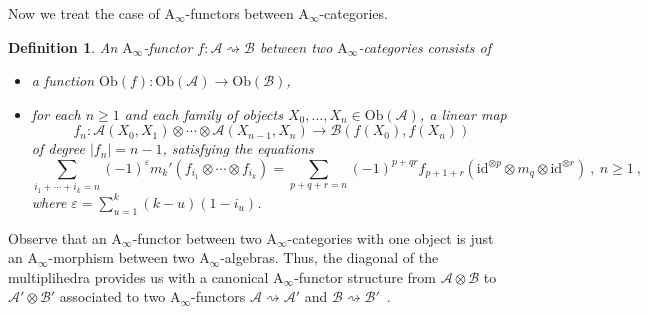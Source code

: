 \documentclass[twoside, 12pt]{amsart}
\newtheorem{definition}{Definition}[section]
\theoremstyle{remark}
\newcommand{\id}{\mathrm{id}}
\newcommand{\cat}[1]{\mathcal{#1}}
\begin{document}
Now we treat the case of $\mathrm{A}_\infty$-functors between $\mathrm{A}_\infty$-categories. 

\begin{definition}
An $\mathrm{A}_\infty$-functor $f : \cat{A} \rightsquigarrow \cat{B}$ between two $\mathrm{A}_\infty$-categories consists of 
\begin{itemize}
\item a function $\mathrm{Ob}(f) : \mathrm{Ob}(\cat{A}) \to \mathrm{Ob}(\cat{B})$,
\item for each $n \geq 1$ and each family of objects $X_0, \ldots, X_n \in \mathrm{Ob}(\cat{A})$, a linear map \[f_n : \cat{A}(X_0,X_1) \otimes \cdots \otimes \cat{A}(X_{n-1},X_n) \to \cat{B}(f(X_0),f(X_n))\] of degree $|f_n|=n-1$, satisfying the equations \[
  \sum_{i_1+\cdots+i_k=n} (-1)^{\varepsilon} m_k'(f_{i_1}\otimes\cdots\otimes f_{i_k}) = 
  \sum_{p+q+r=n} (-1)^{p+qr}f_{p+1+r}(\id^{\otimes p} \otimes m_q \otimes \id^{\otimes r})  \ , \ n\geq 1 \ ,\] where $\varepsilon = \sum_{u=1}^{k}(k-u)(1-i_u)$.
\end{itemize}
\end{definition}

Observe that an $\mathrm{A}_\infty$-functor between two $\mathrm{A}_\infty$-categories with one object is just an $\mathrm{A}_\infty$-morphism between two $\mathrm{A}_\infty$-algebras.
Thus, the diagonal of the multiplihedra provides us with a canonical $\mathrm{A}_\infty$-functor structure from $\cat{A}\otimes \cat{B}$ to $\cat{A}'\otimes \cat{B}'$ associated to two $\mathrm{A}_\infty$-functors $\cat{A}\rightsquigarrow \cat{A}'$ and $\cat{B} \rightsquigarrow \cat{B}'$~. 
\end{document}
